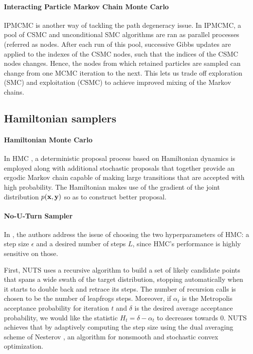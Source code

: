 \paragraph{Interacting Particle Markov Chain Monte Carlo}
\gls{IPMCMC} \cite{Rainforth:2016wq} is another way of tackling the path degeneracy issue.
In \gls{IPMCMC}, a pool of \gls{CSMC} and unconditional \gls{SMC} algorithms are ran as parallel processes (referred as nodes. After each run of this pool, successive Gibbs updates are applied to the indexes of the \gls{CSMC} nodes, such that the indices of the \gls{CSMC} nodes changes. Hence, the nodes from which retained particles are sampled can change from one \gls{MCMC} iteration to the next. This lets us trade off exploration (\gls{SMC}) and exploitation (\gls{CSMC}) to achieve improved mixing of the Markov chains.

\subsection{Hamiltonian samplers}

\paragraph{Hamiltonian Monte Carlo}
In \gls{HMC} \cite{HMC,Neal:2012uu}, a deterministic proposal process based on Hamiltonian dynamics is employed along with additional stochastic proposals that together provide an ergodic Markov chain capable of making large transitions that are accepted with high probability. The Hamiltonian makes use of the gradient of the joint distribution $p(\boldsymbol{\mathbf{x}}, \boldsymbol{\mathbf{y}})$ so as to construct better proposal.

\paragraph{No-U-Turn Sampler}
In \cite{NUTS}, the authors address the issue of choosing the two hyperparameters of \gls{HMC}: a step size $\epsilon$ and a desired number of steps $L$, since \gls{HMC}'s performance is highly sensitive on those.

First, \gls{NUTS} uses a recursive algorithm to build a set of likely candidate points that spans a wide swath of the target distribution, stopping automatically when it starts to double back and retrace its steps. The number of recursion calls is chosen to be the number of leapfrogs steps.
Moreover, if $\alpha_t$ is the Metropolis acceptance probability for iteration $t$ and $\delta$ is the desired average acceptance probability, we would like the statistic $H_t = \delta - \alpha_t$ to decreases towards $0$.
\gls{NUTS} achieves that by adaptively computing the step size using the dual averaging scheme of Nesterov \cite{Nesterov2009}, an algorithm for nonsmooth and stochastic convex optimization.

